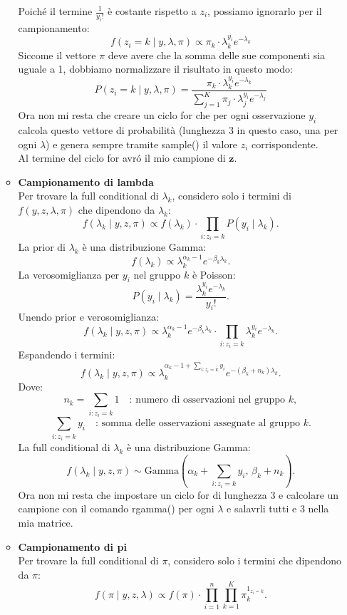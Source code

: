 \documentclass[a4paper,12pt]{article}
\begin{document}
\begin{itemize}
\begin{itemize}
\begin{itemize}
			\end{itemize}
			Poiché il termine \( \frac{1}{y_i!} \) è costante rispetto a \( z_i \), possiamo ignorarlo per il campionamento:
			\[
			f(z_i = k \mid y, \lambda, \pi) \propto \pi_k \cdot \lambda_k^{y_i} e^{-\lambda_k}
			\]
			Siccome il vettore $\pi$ deve avere che la somma delle sue componenti sia uguale a 1, dobbiamo normalizzare il risultato in questo modo:\\
			\[
			P(z_i = k \mid y, \lambda, \pi) = \frac{\pi_k \cdot \lambda_k^{y_i} e^{-\lambda_k}}{\sum_{j=1}^{K} \pi_j \cdot \lambda_j^{y_i} e^{-\lambda_j}}
			\]
			Ora non mi resta che creare un ciclo for che per ogni osservazione $y_i$ calcola questo vettore di probabilità (lunghezza 3 in questo caso, una per ogni $\lambda$) e genera sempre tramite sample() il valore $z_i$ corrispondente.\\
			Al termine del ciclo for avró il mio campione di $\textbf{z}$.
			\item \textbf{Campionamento di lambda}\\
			Per trovare la full conditional di $\lambda_k$, considero solo i termini di $f(y, z, \lambda, \pi)$ che dipendono da $\lambda_k$:
			\[
			f(\lambda_k \mid y, z, \pi) \propto f(\lambda_k) \cdot \prod_{i:z_i=k} P(y_i \mid \lambda_k).
			\]
			La prior di $\lambda_k$ è una distribuzione Gamma:
			\[
			f(\lambda_k) \propto \lambda_k^{\alpha_k - 1} e^{-\beta_k \lambda_k}.
			\]
			La verosomiglianza per $y_i$ nel gruppo $k$ è Poisson:
			\[
			P(y_i \mid \lambda_k) = \frac{\lambda_k^{y_i} e^{-\lambda_k}}{y_i!}.
			\]
			Unendo prior e verosomiglianza:
			\[
			f(\lambda_k \mid y, z, \pi) \propto \lambda_k^{\alpha_k - 1} e^{-\beta_k \lambda_k} \cdot \prod_{i:z_i=k} \lambda_k^{y_i} e^{-\lambda_k}.
			\]
			Espandendo i termini:
			\[
			f(\lambda_k \mid y, z, \pi) \propto \lambda_k^{\alpha_k - 1 + \sum_{i:z_i=k} y_i} e^{-(\beta_k + n_k) \lambda_k}.
			\]
			Dove:
			\[
			n_k = \sum_{i:z_i=k} 1 \quad \text{: numero di osservazioni nel gruppo } k,
			\]
			\[
			\sum_{i:z_i=k} y_i \quad \text{: somma delle osservazioni assegnate al gruppo } k.
			\]
			La full conditional di $\lambda_k$ è una distribuzione Gamma:
			\[
			f(\lambda_k \mid y, z, \pi) \sim \text{Gamma}\left(\alpha_k + \sum_{i:z_i=k} y_i, \, \beta_k + n_k\right).
			\]
			Ora non mi resta che impostare un ciclo for di lunghezza 3 e calcolare un campione con il comando rgamma() per ogni $\lambda$ e salavrli tutti e 3 nella mia matrice.
			\item \textbf{Campionamento di pi}\\
			Per trovare la full conditional di $\pi$, considero solo i termini che dipendono da $\pi$:
			\[
			f(\pi \mid y, z, \lambda) \propto f(\pi) \cdot \prod_{i=1}^n \prod_{k=1}^K \pi_k^{1_{z_i=k}}.
			\]
			

\end{itemize}
\end{itemize}
\end{document}
